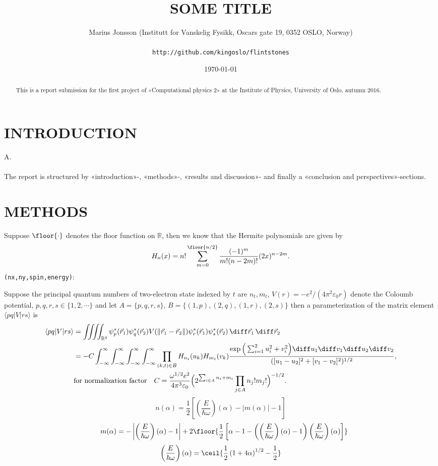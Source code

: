 \documentclass[11pt,english,a4paper]{article}
\author{\normalsize Marius Jonsson (Institutt for Vanskelig Fysikk, Oscars gate 19, 0352 OSLO, Norway) \\\\
\vspace{5px}
\normalsize \texttt{http://github.com/kingoslo/flintstones}}
\title{\bf \uppercase{Some title}}
\date{\normalsize \today}
\begin{document}
\maketitle
\begin{abstract} \normalsize This is a report submission for the first project of «Computational physics 2» at the Institute of Physics, University of Oslo, autumn 2016.
\end{abstract}
\lstset{
  xleftmargin=.2\textwidth, xrightmargin=.2\textwidth
}

\section*{\uppercase{Introduction}}
A.\\
\\
The report is structured by «introduction»-, «methods»-, «results and discussion»- and finally a «conclusion and perspectives»-sections.
\section*{\uppercase{Methods}}
Suppose $\floor{\cdot}$ denotes the floor function on $\mathbb{R}$, then we know that the Hermite polynomials are given by
\[
H_n(x) = n! \sum_{m=0}^{\floor{n/2}} \frac{(-1)^m}{m!(n-2m)!}(2x)^{n-2m}.
\]
\texttt{(nx,ny,spin,energy)}:

Suppose the principal quantum numbers of two-electron state indexed by $t$ are $n_t,m_t$, $V(r) = -e^2/(4\pi^2\varepsilon_0 r)$ denote the Coloumb potential, $p,q,r,s \in \{1,2,\cdots\}$ and let $A=\{ p,q,r,s \}$, $B = \{(1,p),(2,q),(1,r),(2,s)\}$ then a parameterization of the matrix element $\langle pq | V  |  rs \rangle$ is
\begin{align*}
\langle pq | V  |  rs \rangle &= \iiiint_{\mathbb{R}^4} \psi^*_p(\vec{r}_1)\psi^*_q(\vec{r}_2)V(\| \vec{r}_1-\vec{r}_2 \|)\psi^*_r(\vec{r}_1)\psi^*_s(\vec{r}_2)\,\diff \vec{r}_1 \, \diff \vec{r}_2\\
&= - C \int_{-\infty}^\infty\int_{-\infty}^\infty\int_{-\infty}^\infty\int_{-\infty}^\infty \prod_{(k,t)\in B} H_{n_t}(u_k) H_{m_t}(v_k)\frac{\exp\Big(\sum_{i=1}^2 u_i^2 + v_i^2 \Big)\diff u_1 \diff v_1 \diff u_2 \diff v_2}{([u_1 - u_2]^2 + [v_1 - v_2]^2)^{1/2}}, \\
&\text{for normalization factor} \quad C = \frac{\omega^{1/2} e^2}{4 \pi^3 \varepsilon_0}\Big( 2^{\sum_{i \in A} n_i + m_i}\prod_{j \in A}n_j!m_j! \Big)^{  -1/2}.
\end{align*}
\[
n(\alpha) = \frac{1}{2} \left[ \left(\frac{E}{\hbar \omega} \right)(\alpha) - |m(\alpha)| - 1 \right]\]
\[ \quad m(\alpha) = - \left| \left(\frac{E}{\hbar \omega} \right)(\alpha) - 1 \right| + 2 \floor{ \frac{1}{2}\left[\alpha - 1 - \left( \left(\frac{E}{\hbar \omega} \right)(\alpha) - 1 \right)\left(\frac{E}{\hbar \omega} \right)(\alpha) \right] }
\]
\[
\left(\frac{E}{\hbar \omega} \right)(\alpha) = \ceil{\frac{1}{2}\left( 1 + 4\alpha \right)^{1/2} - \frac{1}{2} }
\]
\end{document}
